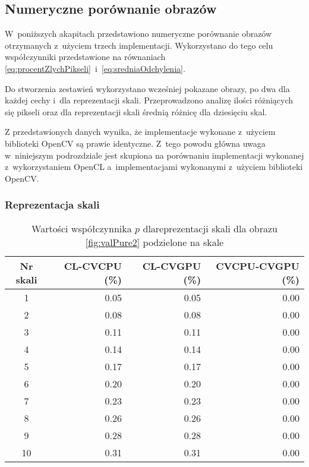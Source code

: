 \subsection{Numeryczne porównanie obrazów}
\label{subsec:porownanieNumerycznePoprawnosc}

W~poniższych akapitach przedstawiono numeryczne porównanie obrazów otrzymanych z~użyciem trzech implementacji. Wykorzystano do tego celu współczynniki przedstawione na równaniach \eqref{eq:procentZlychPikseli}~i~\eqref{eq:sredniaOdchylenia}.

Do stworzenia zestawień wykorzystano wcześniej pokazane obrazy, po dwa dla każdej cechy i~dla reprezentacji skali. Przeprowadzono analizę ilości różniących się pikseli oraz dla reprezentacji skali średnią różnicę dla dziesięciu skal. 

Z przedstawionych danych wynika, że implementacje wykonane z~użyciem biblioteki OpenCV są prawie identyczne. Z~tego powodu główna uwaga w~niniejszym podrozdziale jest skupiona na porównaniu implementacji wykonanej z~wykorzystaniem OpenCL a~implementacjami wykonanymi z~użyciem biblioteki OpenCV.

\subsubsection{Reprezentacja skali}
\label{subsubsec:reprezentacjaSakliTabele}

\begin{center}
\begin{table}
\centering
\caption{Wartości współczynnika $ p $ dlareprezentacji skali dla obrazu \ref{fig:valPure2} podzielone na skale}
\label{tab:imageScaleRep2}
\begin{tabular}{|c|r|r|r|}
 \hline
Nr skali & CL-CVCPU (\%) & CL-CVGPU (\%) & CVCPU-CVGPU (\%) \\ \hline
1        & 0.05     & 0.05     & 0.00        \\ \hline
2        & 0.08     & 0.08     & 0.00        \\ \hline
3        & 0.11     & 0.11     & 0.00        \\ \hline
4        & 0.14     & 0.14     & 0.00        \\ \hline
5        & 0.17     & 0.17     & 0.00        \\ \hline
6        & 0.20     & 0.20     & 0.00        \\ \hline
7        & 0.23     & 0.23     & 0.00        \\ \hline
8        & 0.26     & 0.26     & 0.00        \\ \hline
9        & 0.28     & 0.28     & 0.00        \\ \hline
10       & 0.31     & 0.31     & 0.00        \\ \hline
\end{tabular}
\end{table}
\end{center}

